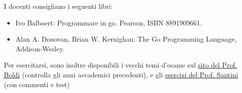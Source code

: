 \documentclass{article}
\begin{document}
\begin{QuestionList}
		 {
		    I docenti consigliano i seguenti libri:
		    \begin{itemize}
		        \item Ivo Balbaert: Programmare in go. Pearson, ISBN 8891909661.\\
		        \item Alan A. Donovan, Brian W. Kernighan: The Go Programming Language, Addison-Wesley.\\
		    \end{itemize}
		    
		    Per esercitarsi, sono inoltre disponibili i vecchi temi d'esame sul \href{http://boldi.di.unimi.it/Corsi/Inf2020/}{sito del Prof. Boldi} (controlla gli anni accademici precedenti), e gli \href{https://labprog.mapio.it/}{esercizi del Prof. Santini} (con commenti e test)
		}
		
	\end{QuestionList}
	
\end{document}

